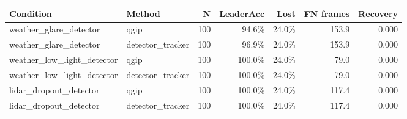 \begin{tabular}{llrrrrr}
\toprule
\textbf{Condition} & \textbf{Method} & \textbf{N} & \textbf{LeaderAcc} & \textbf{Lost} & \textbf{FN frames} & \textbf{Recovery} \\
\midrule
weather\_glare\_detector & qgip & 100 & 94.6\% & 24.0\% & 153.9 & 0.000 \\
weather\_glare\_detector & detector\_tracker & 100 & 96.9\% & 24.0\% & 153.9 & 0.000 \\
weather\_low\_light\_detector & qgip & 100 & 100.0\% & 24.0\% & 79.0 & 0.000 \\
weather\_low\_light\_detector & detector\_tracker & 100 & 100.0\% & 24.0\% & 79.0 & 0.000 \\
lidar\_dropout\_detector & qgip & 100 & 100.0\% & 24.0\% & 117.4 & 0.000 \\
lidar\_dropout\_detector & detector\_tracker & 100 & 100.0\% & 24.0\% & 117.4 & 0.000 \\
\bottomrule
\end{tabular}
